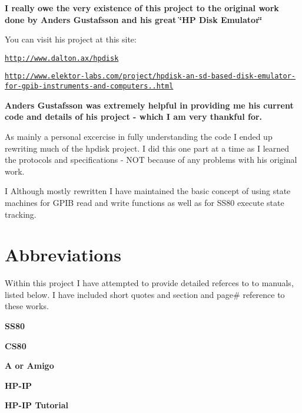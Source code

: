 {\bfseries I really owe the very existence of this project to the original work done by Anders Gustafsson and his great \char`\"{}\+H\+P Disk Emulator\char`\"{} }
\begin{DoxyItemize}
\item You can visit his project at this site\+:
\begin{DoxyItemize}
\item \href{http://www.dalton.ax/hpdisk}{\tt http\+://www.\+dalton.\+ax/hpdisk}
\item \href{http://www.elektor-labs.com/project/hpdisk-an-sd-based-disk-emulator-for-gpib-instruments-and-computers.13693.html}{\tt http\+://www.\+elektor-\/labs.\+com/project/hpdisk-\/an-\/sd-\/based-\/disk-\/emulator-\/for-\/gpib-\/instruments-\/and-\/computers..\+html}
\end{DoxyItemize}
\end{DoxyItemize}

{\bfseries Anders Gustafsson was extremely helpful in providing me his current code and details of his project -\/ which I am very thankful for.}

As mainly a personal excercise in fully understanding the code I ended up rewriting much of the hpdisk project. I did this one part at a time as I learned the protocols and specifications -\/ N\+OT because of any problems with his original work.

I Although mostly rewritten I have maintained the basic concept of using state machines for G\+P\+IB read and write functions as well as for S\+S80 execute state tracking.



 \section*{Abbreviations}

Within this project I have attempted to provide detailed referces to to manuals, listed below. I have included short quotes and section and page\# reference to these works.
\begin{DoxyItemize}
\item {\bfseries S\+S80}
\item {\bfseries C\+S80}
\item {\bfseries A or Amigo}
\item {\bfseries H\+P-\/\+IP}
\item {\bfseries H\+P-\/\+IP Tutorial}
\end{DoxyItemize}

